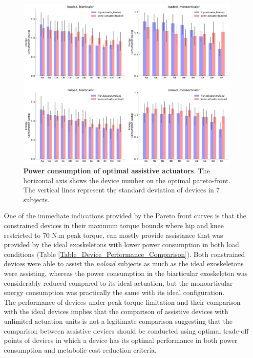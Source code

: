 \documentclass[10pt,letterpaper]{article}
\begin{document}
\begin{figure}[ht]   
	\centering
	\includegraphics[width=\linewidth]{Pareto_Simulations_Figures/PaperFigure_Paretofront_EnergyBarPlot.pdf}
	\vspace{1mm}
	\caption{{\small\textbf{Power consumption of optimal assistive actuators}. The horizontal axis shows the device number on the optimal pareto-front. The vertical lines represent the standard deviation of devices in 7 subjects.}}
	\label{Fig_Paretofronts_Actuators_EnergyBarPlot}
\end{figure}
 One of the immediate indications provided by the Pareto front curves is that the constrained devices in their maximum torque bounds where hip and knee restricted to 70 N.m peak torque, can mostly provide assistance that was provided by the ideal exoskeletons with lower power consumption in both load conditions (Table \ref{Table_Device_Performance_Comparison}).  Both constrained devices were able to assist the \textit{noload} subjects as much as the ideal exoskeletons were assisting, whereas the power consumption in the biarticular exoskeleton was considerably reduced compared to its ideal actuation, but the monoarticular energy consumption was practically the same with its ideal configuration.\\
The performance of devices under peak torque limitation and their comparison with the ideal devices implies that the comparison of assistive devices with unlimited actuation units is not a legitimate comparison suggesting that the comparison between assistive devices should be conducted using optimal trade-off points of devices in which a device has its optimal performance in both power consumption and metabolic cost reduction criteria.\\
\end{document}
